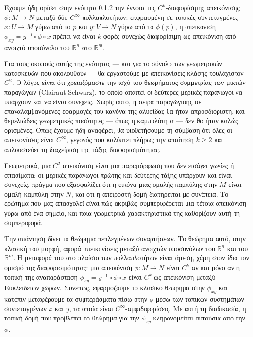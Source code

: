\documentclass[11pt,a4paper,twoside,openright]{book}
\begin{document}
Έχουμε ήδη ορίσει στην ενότητα 0.1.2 την έννοια της $C^k$-διαφορίσιμης απεικόνισης $\phi: M \to N$ μεταξύ δύο $C^\infty$-πολλαπλοτήτων: εκφρασμένη σε τοπικές συντεταγμένες $x: U \to M$ γύρω από το $p$ και $y: V \to N$ γύρω από το $\phi(p)$, η απεικόνιση $\phi_{xy} = y^{-1} \circ \phi \circ x$ πρέπει να είναι $k$ φορές συνεχώς διαφορίσιμη ως απεικόνιση από ανοιχτό υποσύνολο του $\mathbb{R}^n$ στο $\mathbb{R}^m$.

Για τους σκοπούς αυτής της ενότητας --- και για το σύνολο των γεωμετρικών κατασκευών που ακολουθούν --- θα εργαστούμε με απεικονίσεις κλάσης τουλάχιστον $C^2$. Ο λόγος είναι ότι χρειαζόμαστε την ισχύ του θεωρήματος συμμετρίας των μικτών παραγώγων (Clairaut-Schwarz), το οποίο απαιτεί οι δεύτερες μερικές παράγωγοι να υπάρχουν και να είναι συνεχείς. Χωρίς αυτό, η σειρά παραγώγισης σε επαναλαμβανόμενες εφαρμογές του κανόνα της αλυσίδας θα ήταν απροσδιόριστη, και θεμελιώδεις γεωμετρικές ποσότητες --- όπως η καμπυλότητα --- δεν θα ήταν καλώς ορισμένες. Όπως έχουμε ήδη αναφέρει, θα υιοθετήσουμε τη σύμβαση ότι όλες οι απεικονίσεις είναι $C^\infty$, γεγονός που καλύπτει πλήρως την απαίτηση $k \geq 2$ και απλουστεύει τη διαχείριση της τάξης διαφορισιμότητας.

Γεωμετρικά, μια $C^2$ απεικόνιση είναι μια παραμόρφωση που δεν εισάγει γωνίες ή σπασίματα: οι μερικές παράγωγοι πρώτης και δεύτερης τάξης υπάρχουν και είναι συνεχείς, πράγμα που εξασφαλίζει ότι η εικόνα μιας ομαλής καμπύλης στην $M$ είναι ομαλή καμπύλη στην $N$, και ότι η απειροστή δομή διατηρείται με συνέπεια. Το ερώτημα που μας απασχολεί είναι πώς ακριβώς συμπεριφέρεται μια τέτοια απεικόνιση γύρω από ένα σημείο, και ποια γεωμετρικά χαρακτηριστικά της καθορίζουν αυτή τη συμπεριφορά.

Την απάντηση δίνει το θεώρημα πεπλεγμένων συναρτήσεων. Το θεώρημα αυτό, στην κλασική του μορφή, αφορά απεικονίσεις μεταξύ ανοιχτών υποσυνόλων του $\mathbb{R}^n$ και του $\mathbb{R}^m$. Η μεταφορά του στο πλαίσιο των πολλαπλοτήτων είναι άμεση, χάρη στον ίδιο τον ορισμό της διαφορισιμότητας: μια απεικόνιση $\phi: M \to N$ είναι $C^k$ αν και μόνο αν η τοπική της αναπαράσταση $\phi_{xy} = y^{-1} \circ \phi \circ x$ είναι $C^k$ ως απεικόνιση μεταξύ Ευκλείδειων χώρων. Συνεπώς, εφαρμόζουμε το κλασικό θεώρημα στην $\phi_{xy}$ και κατόπιν μεταφέρουμε τα συμπεράσματα πίσω στην $\phi$ μέσω των τοπικών συστημάτων συντεταγμένων $x$ και $y$, τα οποία είναι $C^\infty$-αμφιδιφορίσεις. Με αυτή τη διαδικασία, η τοπική δομή που προβλέπει το θεώρημα για την $\phi_{xy}$ κληρονομείται αυτούσια από την $\phi$.
\end{document}
